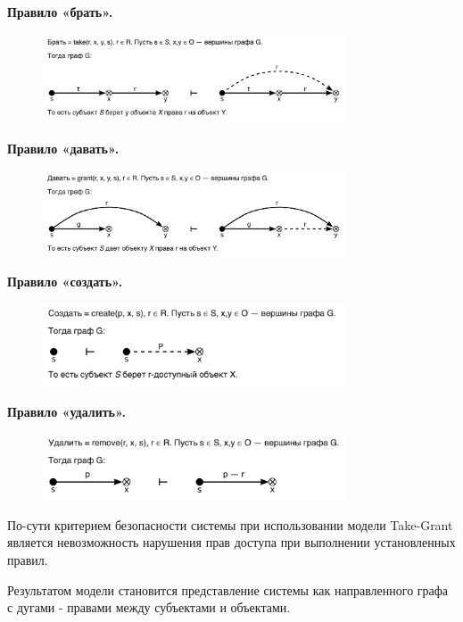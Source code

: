 \textbf{Правило «брать».}
\begin{figure}[H]
    \centering
    \includegraphics[width=0.8\textwidth]{assets/models/take_grant_bring.png}
\end{figure}

\textbf{Правило «давать».}
\begin{figure}[H]
    \centering
    \includegraphics[width=0.8\textwidth]{assets/models/take_grant_give.png}
\end{figure}

\textbf{Правило «создать».}
\begin{figure}[H]
    \centering
    \includegraphics[width=0.8\textwidth]{assets/models/take_grant_create.png}
\end{figure}

\textbf{Правило «удалить».}
\begin{figure}[H]
    \centering
    \includegraphics[width=0.8\textwidth]{assets/models/take_grant_delete.png}
\end{figure}

По-сути критерием безопасности системы при использовании модели Take-Grant является невозможность нарушения 
прав доступа при выполнении установленных правил.

Результатом модели становится представление системы как направленного графа с дугами - правами между субъектами 
и объектами.


